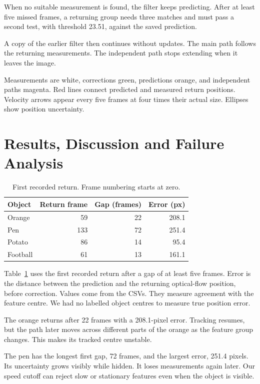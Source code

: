 \documentclass[conference]{assets/latex/IEEEtran}
\begin{document}
When no suitable measurement is found, the filter keeps predicting. After at least five missed frames, a returning group needs three matches and must pass a second test, with threshold 23.51, against the saved prediction.

A copy of the earlier filter then continues without updates. The main path follows the returning measurements. The independent path stops extending when it leaves the image.

Measurements are white, corrections green, predictions orange, and independent paths magenta. Red lines connect predicted and measured return positions. Velocity arrows appear every five frames at four times their actual size. Ellipses show position uncertainty.

\section{Results, Discussion and Failure Analysis}
\begin{table}[t]
\centering
\caption{First recorded return. Frame numbering starts at zero.}
\label{tab:results}
\begin{tabular}{lrrr}
\hline
Object & Return frame & Gap (frames) & Error (px)\\
\hline
Orange & 59 & 22 & 208.1\\
Pen & 133 & 72 & 251.4\\
Potato & 86 & 14 & 95.4\\
Football & 61 & 13 & 161.1\\
\hline
\end{tabular}
\end{table}

Table~\ref{tab:results} uses the first recorded return after a gap of at least five frames. Error is the distance between the prediction and the returning optical-flow position, before correction. Values come from the CSVs. They measure agreement with the feature centre. We had no labelled object centres to measure true position error.

The orange returns after 22 frames with a 208.1-pixel error. Tracking resumes, but the path later moves across different parts of the orange as the feature group changes. This makes its tracked centre unstable.

The pen has the longest first gap, 72 frames, and the largest error, 251.4 pixels. Its uncertainty grows visibly while hidden. It loses measurements again later. Our speed cutoff can reject slow or stationary features even when the object is visible.
\end{document}
